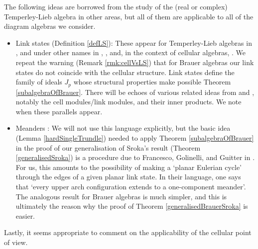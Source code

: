 \documentclass[12pt]{amsart}
\theoremstyle{plain}
\theoremstyle{definition} \newtheorem{definition}[theorem]{Definition}
\theoremstyle{plain}
\theoremstyle{plain} \newtheorem{proposition}[theorem]{Proposition}
\theoremstyle{plain} \newtheorem{conjecture}[theorem]{Conjecture}
\theoremstyle{plain} \newtheorem{corollary}[theorem]{Corollary}
\theoremstyle{remark} \newtheorem{claim}[theorem]{Claim}
\theoremstyle{remark} \newtheorem{remark}[theorem]{Remark}
\theoremstyle{remark} \newtheorem{example}[theorem]{Example}
\theoremstyle{remark} \newtheorem{comment}[theorem]{Comment}
\theoremstyle{definition} \newtheorem{question}[theorem]{Question}
\begin{document}
The following ideas are borrowed from the study of the (real or complex) Temperley-Lieb algebra in other areas, but all of them are applicable to all of the diagram algebras we consider.
\begin{itemize}
    \item Link states (Definition \ref{defLS}): These appear for Temperley-Lieb algebras in \cite{RidoutSaintAubin}, and under other names in \cite{Kauffman}, \cite{FGG-TL}, and, in the context of cellular algebras, \cite{GrahamLehrer}. We repeat the warning (Remark \ref{rmk:cellVsLS}) that for Brauer algebras our link states do not coincide with the cellular structure. Link states define the family of ideals $J_p$ whose structural properties make possible Theorem \ref{subalgebraOfBrauer}. There will be echoes of various related ideas from \cite{GrahamLehrer} and \cite{RidoutSaintAubin}, notably the cell modules/link modules, and their inner products. We note when these parallels appear.
    \item Meanders \cite{FGG}: We will not use this language explicitly, but the basic idea (Lemma \ref{hardSingleTrundle}) needed to apply Theorem \ref{subalgebraOfBrauer} in the proof of our generalisation of Sroka's result (Theorem \ref{generalisedSroka}) is a procedure due to Francesco, Golinelli, and Guitter in \cite{FGG}. For us, this amounts to the possibility of making a `planar Eulerian cycle' through the edges of a given planar link state. In their language, one says that `every upper arch configuration extends to a one-component meander'. The analogous result for Brauer algebras is much simpler, and this is ultimately the reason why the proof of Theorem \ref{generalisedBrauerSroka} is easier.
\end{itemize}

Lastly, it seems appropriate to comment on the applicability of the cellular point of view.
\end{document}
